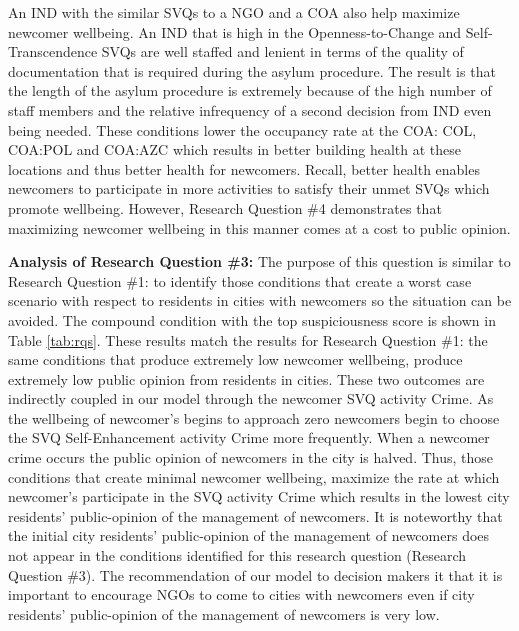 \documentclass{scspaperproc}
\theoremstyle{scsthe}
\begin{document}
An IND with the similar SVQs to a NGO and a COA also help maximize newcomer wellbeing. An IND that is high in the Openness-to-Change and Self-Transcendence SVQs are well staffed and lenient in terms of the quality of documentation that is required during the asylum procedure. The result is that the length of the asylum procedure is extremely because of the high number of staff members and the relative infrequency of a second decision from IND even being needed. These conditions lower the occupancy rate at the COA: COL, COA:POL and COA:AZC which results in better building health at these locations and thus better health for newcomers. Recall, better health enables newcomers to participate in more activities to satisfy their unmet SVQs which promote wellbeing. However, Research Question \#4 demonstrates that maximizing newcomer wellbeing in this manner comes at a cost to public opinion. 

{\bf Analysis of Research Question \#3:} The purpose of this question is similar to Research Question \#1: to identify those conditions that create a worst case scenario with respect to residents in cities with newcomers so the situation can be avoided. The compound condition with the top suspiciousness score is shown in Table \ref{tab:rqs}. These results match the results for Research Question \#1: the same conditions that produce extremely low newcomer wellbeing, produce extremely low public opinion from residents in cities. These two outcomes are indirectly coupled in our model through the newcomer SVQ activity Crime. As the wellbeing of newcomer's begins to approach zero newcomers begin to choose the SVQ Self-Enhancement activity Crime more frequently.  When a newcomer crime occurs the public opinion of newcomers in the city is halved. Thus, those conditions that create minimal newcomer wellbeing, maximize the rate at which newcomer's participate in the SVQ activity Crime which results in the lowest city residents' public-opinion of the management of newcomers. It is noteworthy that the initial city residents' public-opinion of the management of newcomers does not appear in the conditions identified for this research question (Research Question \#3). The recommendation of our model to decision makers it that it is important to encourage NGOs to come to cities with newcomers even if city residents' public-opinion of the management of newcomers is very low. 
\end{document}
